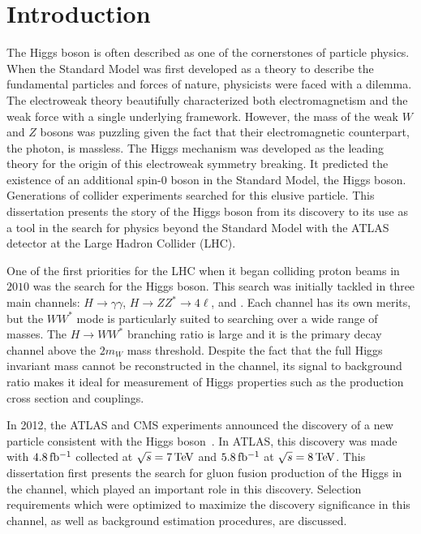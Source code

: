 \chapter{Introduction}
\label{introduction}

The Higgs boson is often described as one of the cornerstones of particle physics. When the Standard Model was first developed as a theory to describe the fundamental particles and forces of nature, physicists were faced with a dilemma. The electroweak theory beautifully characterized both electromagnetism and the weak force with a single underlying framework. However, the mass of the weak $W$ and $Z$ bosons was puzzling given the fact that their electromagnetic counterpart, the photon, is massless. The Higgs mechanism was developed as the leading theory for the origin of this electroweak symmetry breaking. It predicted the existence of an additional spin-$0$ boson in the Standard Model, the Higgs boson. Generations of collider experiments searched for this elusive particle. This dissertation presents the story of the Higgs boson from its discovery to its use as a tool in the search for physics beyond the Standard Model with the ATLAS detector at the Large Hadron Collider (LHC). 

One of the first priorities for the LHC when it began colliding proton beams in $2010$ was the search for the Higgs boson. This search was initially tackled in three main channels: $H\to \gamma\gamma$, $H\to ZZ^* \to 4\ell $, and \HWWfull. Each channel has its own merits, but the $WW^*$ mode is particularly suited to searching over a wide range of masses. The $H\to WW^*$ branching ratio is large and it is the primary decay channel above the $2m_W$ mass threshold. Despite the fact that the full Higgs invariant mass cannot be reconstructed in the \HWWfull channel, its signal to background ratio makes it ideal for measurement of Higgs properties such as the production cross section and couplings. 

In 2012, the ATLAS and CMS experiments announced the discovery of a new particle consistent with the Higgs boson~\cite{Discovery,CMSDiscovery}. In ATLAS, this discovery was made with $4.8 \mbox{\,fb$^{-1}$}$ collected at $\sqrt{s} = 7 \TeV$ and $5.8 \mbox{\,fb$^{-1}$}$ at $\sqrt{s} = 8 \TeV$. This dissertation first presents the search for gluon fusion production of the Higgs in the \HWWfull channel, which played an important role in this discovery. Selection requirements which were optimized to maximize the discovery significance in this channel, as well as background estimation procedures, are discussed. 

